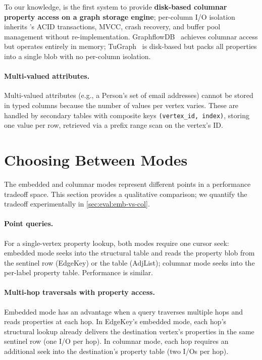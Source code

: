 To our knowledge, \project{} is the first system to provide \textbf{disk-based columnar property access on a graph storage engine}; per-column I/O isolation inherits \wt{}'s ACID transactions, MVCC, crash recovery, and buffer pool management without re-implementation.
GraphflowDB~\cite{graphflowdb2021Gupta} achieves columnar access but operates entirely in memory; TuGraph~\cite{linBuildingHighPerformanceGraph2024} is disk-based but packs all properties into a single blob with no per-column isolation.

\paragraph{Multi-valued attributes.}
Multi-valued attributes (e.g., a Person's set of email addresses) cannot be stored in typed columns because the number of values per vertex varies.
These are handled by secondary tables with composite keys \texttt{(vertex\_id, index)}, storing one value per row, retrieved via a prefix range scan on the vertex's ID.

\section{Choosing Between Modes}
\label{arch:prop-choosing}

The embedded and columnar modes represent different points in a performance tradeoff space.
This section provides a qualitative comparison; we quantify the tradeoff experimentally in \autoref{sec:eval:emb-vs-col}.

\paragraph{Point queries.}
For a single-vertex property lookup, both modes require one cursor seek: embedded mode seeks into the structural table and reads the property blob from the sentinel row (EdgeKey) or the  table (AdjList); columnar mode seeks into the per-label property table.
Performance is similar.

\paragraph{Multi-hop traversals with property access.}
Embedded mode has an advantage when a query traverses multiple hops and reads properties at each hop.
In EdgeKey's embedded mode, each hop's structural lookup already delivers the destination vertex's properties in the same sentinel row (one I/O per hop).
In columnar mode, each hop requires an additional seek into the destination's property table (two I/Os per hop).

